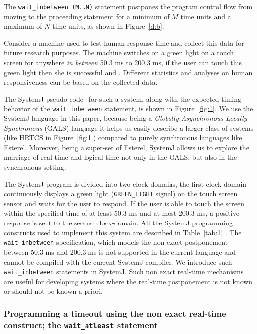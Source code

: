 The \texttt{wait\_inbetween (M..N)} statement postpones the program
control flow from moving to the proceeding statement for a minimum of
$M$ time units and a maximum of $N$ time units, as shown in
Figure~\ref{d:b}.

Consider a machine used to test human response time and collect this
data for future research purposes. The machine switches on a green light
on a touch screen for anywhere \textit{in between} 50.3 ms to 200.3 ms,
if the user can touch this green light then she is successful and . Different statistics and analyses on human
responsiveness can be based on the collected data.

The SystemJ pseudo-code~\cite{amal10} for such a system, along with the
expected timing behavior of the \texttt{wait\_inbetween} statement, is
shown in Figure~\ref{fig:1}. We use the SystemJ language in this paper,
because being a \textit{Globally Asynchronous Locally Synchronous}
(GALS) language it helps us easily describe a larger class of systems
(like HRTCS in Figure~\ref{fig:1}) compared to purely synchronous
languages like Esterel. Moreover, being a super-set of Esterel, SystemJ
allows us to explore the marriage of real-time and logical time not only
in the GALS, but also in the synchronous setting.

The SystemJ program is divided into two 
clock-domains, the first clock-domain continuously displays a green
light (\texttt{GREEN\_LIGHT} signal) on the touch screen sensor and
waits for the user to respond. If the user is able to touch the screen
within the specified time of at least 50.3 ms and at most 200.3 ms, a
positive response is sent to the second clock-domain. All the SystemJ
programming constructs used to implement this system are described in
Table~\ref{tab:1} . The \texttt{wait\_inbetween} specification, which
models the non exact postponement between 50.3 ms and 200.3 ms is not
supported in the current language and cannot be compiled with the
current SystemJ compiler. We introduce such \texttt{wait\_inbetween}
statements in SystemJ. Such non exact real-time mechanisms are useful
for developing systems where the real-time postponement is not known or
should not be known a priori.

\subsubsection{Programming a timeout using the non exact real-time
  construct; the \texttt{wait\_atleast} statement}
\label{sec:progr-time-using}

